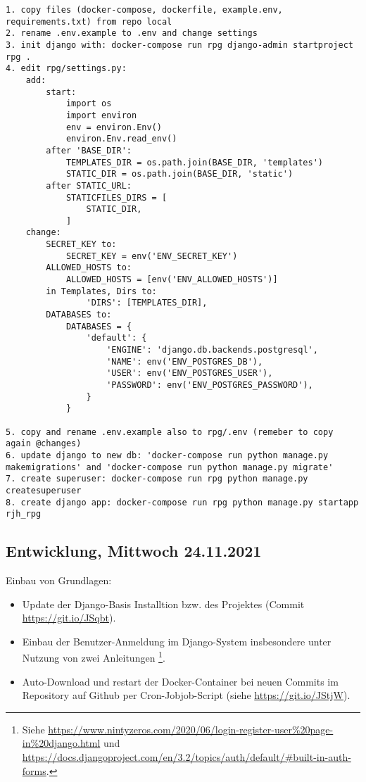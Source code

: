 \begin{lstlisting}
1. copy files (docker-compose, dockerfile, example.env, requirements.txt) from repo local
2. rename .env.example to .env and change settings 
3. init django with: docker-compose run rpg django-admin startproject rpg .
4. edit rpg/settings.py:
    add:
        start:
            import os
            import environ
            env = environ.Env()
            environ.Env.read_env()
        after 'BASE_DIR':
            TEMPLATES_DIR = os.path.join(BASE_DIR, 'templates')
            STATIC_DIR = os.path.join(BASE_DIR, 'static')
        after STATIC_URL:
            STATICFILES_DIRS = [
                STATIC_DIR,
            ]
    change: 
        SECRET_KEY to:
            SECRET_KEY = env('ENV_SECRET_KEY')
        ALLOWED_HOSTS to:
            ALLOWED_HOSTS = [env('ENV_ALLOWED_HOSTS')]
        in Templates, Dirs to:
                'DIRS': [TEMPLATES_DIR],
        DATABASES to:
            DATABASES = {
                'default': {
                    'ENGINE': 'django.db.backends.postgresql',
                    'NAME': env('ENV_POSTGRES_DB'),
                    'USER': env('ENV_POSTGRES_USER'),
                    'PASSWORD': env('ENV_POSTGRES_PASSWORD'),
                }
            }

5. copy and rename .env.example also to rpg/.env (remeber to copy again @changes)
6. update django to new db: 'docker-compose run python manage.py makemigrations' and 'docker-compose run python manage.py migrate'
7. create superuser: docker-compose run rpg python manage.py createsuperuser
8. create django app: docker-compose run rpg python manage.py startapp rjh_rpg 
\end{lstlisting}




\subsection{Entwicklung, Mittwoch 24.11.2021}

Einbau von Grundlagen: 
\begin{itemize}
    \item Update der Django-Basis Installtion bzw. des Projektes (Commit \url{https://git.io/JSqbt}). 
    \item Einbau der Benutzer-Anmeldung im Django-System insbesondere unter Nutzung von zwei Anleitungen   \footnote{Siehe  \url{https://www.nintyzeros.com/2020/06/login-register-user\%20page-in\%20django.html} und \url{https://docs.djangoproject.com/en/3.2/topics/auth/default/\#built-in-auth-forms}.}.
    \item Auto-Download und restart der Docker-Container bei neuen Commits im Repository auf Github per Cron-Jobjob-Script (siehe \url{https://git.io/JStjW}).
\end{itemize}




